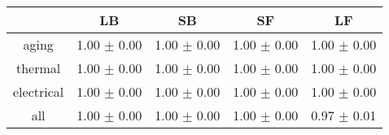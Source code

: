 \begin{tabular}{c c c c c }
\hline
 & LB & SB & SF & LF \\
\hline
aging & 1.00 $\pm$ 0.00 & 1.00 $\pm$ 0.00 & 1.00 $\pm$ 0.00 & 1.00 $\pm$ 0.00 \\
thermal & 1.00 $\pm$ 0.00 & 1.00 $\pm$ 0.00 & 1.00 $\pm$ 0.00 & 1.00 $\pm$ 0.00 \\
electrical & 1.00 $\pm$ 0.00 & 1.00 $\pm$ 0.00 & 1.00 $\pm$ 0.00 & 1.00 $\pm$ 0.00 \\
all & 1.00 $\pm$ 0.00 & 1.00 $\pm$ 0.00 & 1.00 $\pm$ 0.00 & 0.97 $\pm$ 0.01 \\
\hline
\end{tabular}